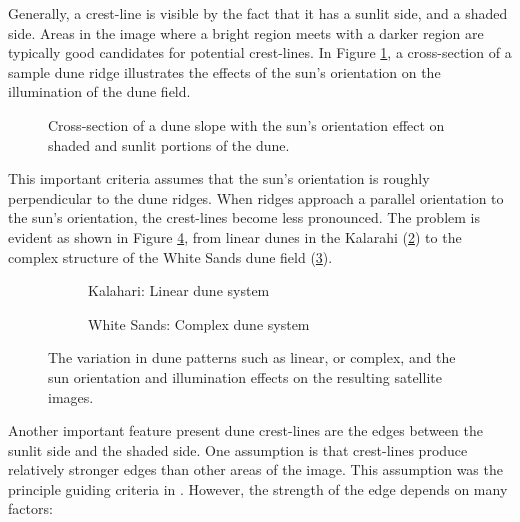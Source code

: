  Generally, a crest-line is visible by the fact that it has a sunlit side, and a shaded side. Areas in the image where a bright region meets with a darker region are typically good candidates for potential crest-lines. In Figure \ref{fig:dune_cross_section}, a cross-section of a sample dune ridge illustrates the effects of the sun's orientation on the illumination of the dune field.
 
 \begin{figure}
 	\centering
 	\caption{Cross-section of a dune slope with the sun's orientation effect on shaded and sunlit portions of the dune.}
 	\label{fig:dune_cross_section}
 \end{figure}
 
 This important criteria assumes that the sun's orientation is roughly perpendicular to the dune ridges. When ridges approach a parallel orientation to the sun's orientation, the crest-lines become less pronounced. The problem is evident as shown in Figure \ref{fig:difference_between_dune_field_types}, from linear dunes in the Kalarahi (\ref{fig:difference_between_dune_field_types_kalahari}) to the complex structure of the White Sands dune field (\ref{fig:difference_between_dune_field_types_whitesands}).
 
 \begin{figure}
 	\centering
 	\begin{subfigure}{0.48\textwidth}
 		\centering
 		\caption{Kalahari: Linear dune system}
 		\label{fig:difference_between_dune_field_types_kalahari}
 	\end{subfigure}
 	\begin{subfigure}{0.48\textwidth}
 		\centering
 		\caption{White Sands: Complex dune system}
 		\label{fig:difference_between_dune_field_types_whitesands}
 	\end{subfigure}
 	
 	\caption{The variation in dune patterns such as  linear, or  complex, and the sun orientation and illumination effects on the resulting satellite images.}
 	\label{fig:difference_between_dune_field_types}
 \end{figure}
 
 Another important feature present dune crest-lines are the edges between the sunlit side and the shaded side. One assumption is that crest-lines produce relatively stronger edges than other areas of the image. This assumption was the principle guiding criteria in \cite{2015_automated_mapping_of_linear_dunefield}. However, the strength of the edge depends on many factors:
 
